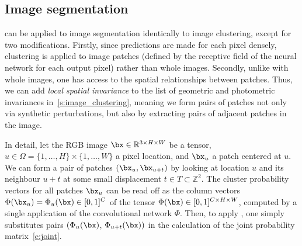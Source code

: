 \subsection{Image segmentation}\label{s:image_segmentation}

\methodnameshort can be applied to image segmentation identically to image clustering, except for two modifications.
Firstly, since predictions are made for each pixel densely, clustering is applied to image patches (defined by the receptive field of the neural network for each output pixel) rather than whole images.
Secondly, unlike with whole images, one has access to the spatial relationships between patches.
Thus, we can add \emph{local spatial invariance} to the list of geometric and photometric invariances in~\cref{s:image_clustering}, meaning we form pairs of patches not only via synthetic perturbations, but also by extracting pairs of adjacent patches in the image.



In detail, let the RGB image $\bx\in\mathbb{R}^{3\times H\times W}$ be a tensor, $u \in \Omega = \{1,\dots,H\}\times\{1,\dots,W\}$ a pixel location, and $\bx_u$ a patch centered at $u$.
We can form a pair of patches $(\bx_u,\bx_{u+t})$ by looking at location $u$ and its neighbour $u+t$ at some small displacement $t\in T \subset\mathbb{Z}^2$.
The cluster probability vectors for all patches $\bx_u$ can be read off as the column vectors $\Phi(\bx_u) = \Phi_u(\bx) \in [0,1]^C$ of the tensor $\Phi(\bx)\in [0,1]^{C\times H\times W}$, computed by a single application of the convolutional network $\Phi$.
Then, to apply \methodnameshort, one simply substitutes pairs $(\Phi_u(\bx)$, $\Phi_{u + t}(\bx))$ in the calculation of the joint probability matrix~\eqref{e:joint}.


